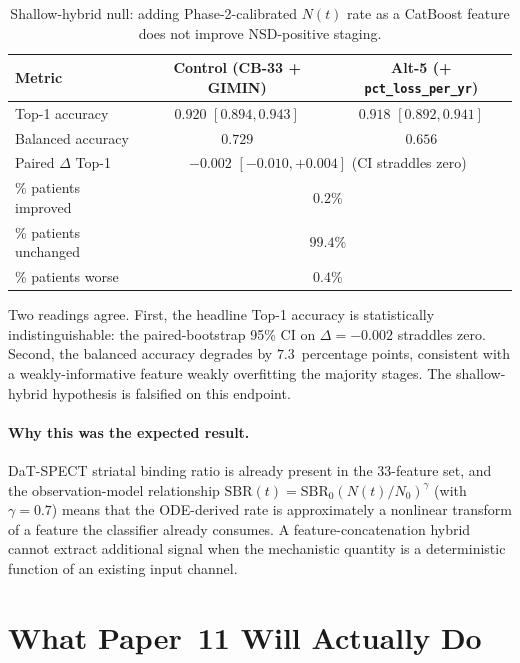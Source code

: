 \begin{table}[H]
\centering
\small
\caption{Shallow-hybrid null: adding Phase-2-calibrated $N(t)$ rate as a CatBoost feature does not improve NSD-positive staging.}
\label{tab:p11-alt5}
\begin{tabular}{lcc}
\toprule
\textbf{Metric} & \textbf{Control (CB-33 + GIMIN)} & \textbf{Alt-5 (+ \texttt{pct\_loss\_per\_yr})} \\
\midrule
Top-1 accuracy     & $0.920$ $[0.894, 0.943]$ & $0.918$ $[0.892, 0.941]$ \\
Balanced accuracy  & $0.729$                   & $0.656$                   \\
Paired $\Delta$ Top-1 & \multicolumn{2}{c}{$-0.002$ $[-0.010, +0.004]$ (CI straddles zero)} \\
\% patients improved & \multicolumn{2}{c}{$0.2\%$} \\
\% patients unchanged & \multicolumn{2}{c}{$99.4\%$} \\
\% patients worse  & \multicolumn{2}{c}{$0.4\%$} \\
\bottomrule
\end{tabular}
\end{table}

Two readings agree. First, the headline Top-1 accuracy is statistically indistinguishable: the paired-bootstrap 95\% CI on $\Delta = -0.002$ straddles zero. Second, the balanced accuracy degrades by $7.3$~percentage points, consistent with a weakly-informative feature weakly overfitting the majority stages. The shallow-hybrid hypothesis is falsified on this endpoint.

\paragraph{Why this was the expected result.}
DaT-SPECT striatal binding ratio is already present in the 33-feature set, and the observation-model relationship $\mathrm{SBR}(t) = \mathrm{SBR}_0 (N(t)/N_0)^{\gamma}$ (with $\gamma = 0.7$) means that the ODE-derived rate is approximately a nonlinear transform of a feature the classifier already consumes. A feature-concatenation hybrid cannot extract additional signal when the mechanistic quantity is a deterministic function of an existing input channel.

\section{What Paper~11 Will Actually Do}
\label{sec:p11-plan}

